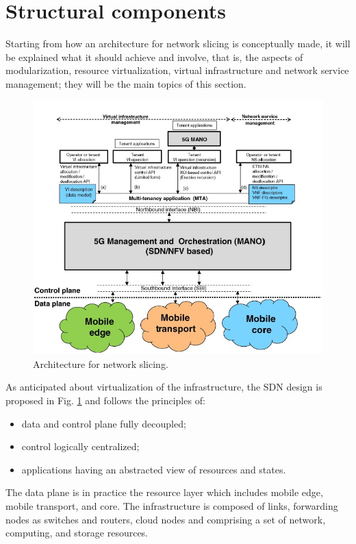 \documentclass[a4paper,12pt]{report} %
\begin{document}
\section{Structural components} 
Starting from how an architecture for network slicing is conceptually made, it will be explained what it should achieve and involve, that is, the aspects of modularization, resource virtualization, virtual infrastructure and network service management; they will be the main topics of this section.
\begin{figure}[h]
\centering
\includegraphics[scale=0.67]{pics/2.JPG}
\caption{Architecture for network slicing. \cite{al20185g}} 
\label{Arch}
\end{figure}
As anticipated about virtualization of the infrastructure, the SDN design is proposed in Fig. \ref{Arch} and follows the principles of:
\begin{itemize}
\item data and control plane fully decoupled;
\end{itemize}
\begin{itemize}
\item control logically centralized;
\end{itemize}
\begin{itemize}
\item applications having an abstracted view of resources and states.
\end{itemize}
The data plane is in practice the resource layer which includes mobile edge, mobile transport, and core. The infrastructure is composed of links, forwarding nodes as switches and routers, cloud nodes  and comprising a set of network, computing, and storage resources.\\
\end{document}

